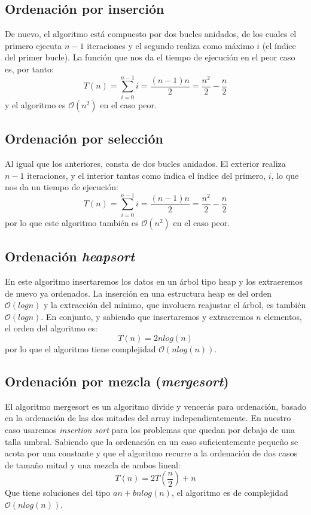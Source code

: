 \documentclass[a4paper, 11pt]{article} %
\begin{document}
\subsection{Ordenación por inserción}
De nuevo, el algoritmo está compuesto por dos bucles anidados, de los cuales el primero ejecuta $n-1$ iteraciones y el segundo realiza como máximo $i$ (el índice del primer bucle). La función que nos da el tiempo de ejecución en el peor caso es, por tanto:
\begin{equation}
 T(n) = \sum_{i=0}^{n-1} i = \frac{(n-1)n}{2} = \frac{n^2}{2} - \frac{n}{2}
\end{equation}
y el algoritmo es $\mathcal{O}(n^2)$ en el caso peor.
\subsection{Ordenación por selección}
Al igual que los anteriores, consta de dos bucles anidados. El exterior realiza $n-1$ iteraciones, y el interior tantas como indica el índice del primero, $i$, lo que nos da un tiempo de ejecución:
\begin{equation}
 T(n) = \sum_{i=0}^{n-1} i = \frac{(n-1)n}{2} = \frac{n^2}{2} - \frac{n}{2}
\end{equation}
por lo que este algoritmo también es $\mathcal{O}(n^2)$ en el caso peor.

\subsection{Ordenación \textit{heapsort}}
En este algoritmo insertaremos los datos en un árbol tipo heap y los extraeremos de nuevo ya ordenados.
La inserción en una estructura heap es del orden $\mathcal{O}(log n)$ y la extracción del mínimo, que involucra
reajustar el árbol, es también $\mathcal{O}(log n)$. En conjunto, y sabiendo que insertaremos y extraeremos $n$ elementos,
el orden del algoritmo es:
\begin{equation}
 T(n) = 2 n log(n)
\end{equation}
por lo que el algoritmo tiene complejidad $\mathcal{O}(nlog(n))$.


\subsection{Ordenación por mezcla (\textit{mergesort})}
El algoritmo mergesort es un algoritmo divide y vencerás para ordenación, basado en la ordenación de las dos mitades del
array independientemente. En nuestro caso usaremos \textit{insertion sort} para los problemas que quedan por debajo de una talla umbral.
Sabiendo que la ordenación en un caso suficientemente pequeño se acota por una constante y que el algoritmo recurre a la ordenación
de dos casos de tamaño mitad y una mezcla de ambos lineal:
\begin{equation}
 T(n) = 2T\left(\frac{n}{2}\right) + n
\end{equation}
Que tiene soluciones del tipo $an + bnlog(n)$, el algoritmo es de complejidad $\mathcal{O}(nlog(n))$.
\end{document}
